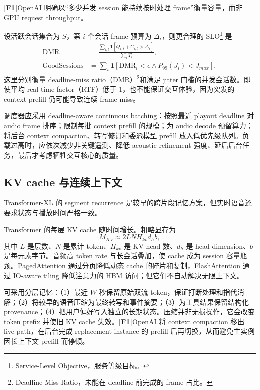 \documentclass[UTF8,fontset=none,a4paper,10pt]{ctexart}
\newcommand{\FOne}{\textcolor{official}{\textbf{[F1]}}}
\begin{document}
\FOne OpenAI 明确以“多少并发 session 能持续按时处理 frame”衡量容量，而非 GPU request throughput\cite{zh:openai2026continuous}。

设活跃会话集合为 $S$，第 $i$ 个会话 frame 预算为 $\Delta_i$，则更合理的 SLO\footnote{Service-Level Objective，服务等级目标。} 是
\begin{align}
\mathrm{DMR} &= \frac{\sum_{i,t}\mathbf 1[Q_{i,t}+C_{i,t}>\Delta_i]}{\sum_iT_i},\\
\mathrm{GoodSessions} &= \sum_i\mathbf 1[\mathrm{DMR}_i<\epsilon\land P_{99}(J_i)<J_{max}],
\end{align}
这里分别衡量 deadline-miss ratio（DMR）\footnote{Deadline-Miss Ratio，未能在 deadline 前完成的 frame 占比。}和满足 jitter 门槛的并发会话数。即使平均 real-time factor（RTF）低于 1，也不能保证交互体验，因为突发的 context prefill 仍可能导致连续 frame miss。

调度器应采用 deadline-aware continuous batching：按照最近 playout deadline 对 audio frame 排序；限制每批 context prefill 的规模；为 audio decode 预留算力；将后台 context compaction、转写修订和委派模型 prefill 放入低优先级队列。负载过高时，应依次减少非关键遥测、降低 acoustic refinement 强度、延后后台任务，最后才考虑牺牲交互核心的质量。

\subsection{KV cache 与连续上下文}

Transformer-XL 的 segment recurrence 是较早的跨片段记忆方案\cite{zh:dai2019transformerxl}，但实时语音还要求状态与播放时间严格一致。

Transformer 的每层 KV cache 随时间增长。粗略显存为
\begin{equation}
M_{KV}\approx 2LNH_{kv}d_hb,
\end{equation}
其中 $L$ 是层数、$N$ 是累计 token、$H_{kv}$ 是 KV head 数、$d_h$ 是 head dimension、$b$ 是每元素字节。音频高 token rate 与长会话叠加，使 cache 成为 session 容量瓶颈。PagedAttention 通过分页降低动态 cache 的碎片和复制，FlashAttention 通过 IO-aware tiling 降低注意力的 HBM 访问\cite{zh:kwon2023pagedattention,zh:dao2022flashattention}；但它们不自动解决无限上下文。

可采用分层记忆：（1）最近 $W$ 秒保留原始双流 token，保证打断处理和指代消解；（2）将较早的语音压缩为最终转写和事件摘要；（3）为工具结果保留结构化 provenance；（4）把用户偏好写入独立的长期状态。压缩并非无损操作，它会改变 token prefix 并使旧 KV cache 失效。\FOne OpenAI 将 context compaction 移出 live path，在后台完成 replacement instance 的 prefill 后再切换\cite{zh:openai2026continuous}，从而避免主实例因长上下文 prefill 而停顿。
\end{document}
